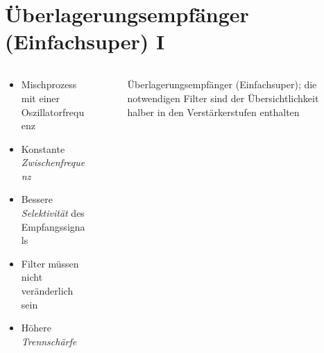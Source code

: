 
\section{Überlagerungsempfänger (Einfachsuper) I}
\label{section:ueberlagerungsempfaenger_einfachsuper_1}
\begin{frame}%

\begin{columns}
    \begin{column}{0.48\textwidth}
    \begin{itemize}
  \item Mischprozess mit einer Oszillatorfrequenz
  \item Konstante \emph{Zwischenfrequenz}
  \item Bessere \emph{Selektivität} des Empfangssignals
  \item Filter müssen nicht veränderlich sein
  \item Höhere \emph{Trennschärfe}
  \end{itemize}

    \end{column}
   \begin{column}{0.48\textwidth}
       
\begin{figure}
    \caption{\scriptsize Überlagerungsempfänger (Einfachsuper); die notwendigen Filter sind der Übersichtlichkeit halber in den Verstärkerstufen enthalten}
    \label{ueberlagerungsempfaenger_einfachsuper}
\end{figure}


   \end{column}
\end{columns}

\end{frame}

\begin{frame}
\end{frame}

